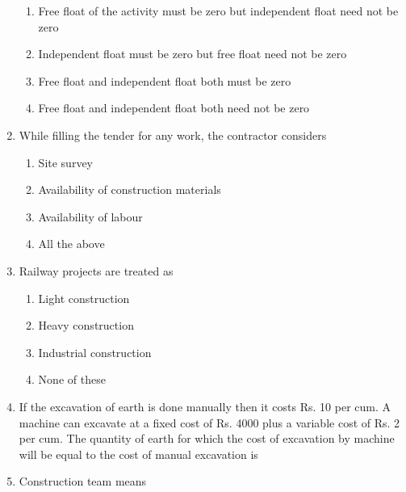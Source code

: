 \documentclass[11pt,a4paper]{article}
\begin{document}
\begin{enumerate}
\begin{enumerate}[label=\Alph*.]
\item{Free float of the activity must be zero but independent float need not be zero}
\item{Independent float must be zero but free float need not be zero}
\item{Free float and independent float both must be zero}
\item{Free float and independent float both need not be zero}
\end{enumerate}
\item{While filling the tender for any work, the contractor considers}
\begin{enumerate}[label=\Alph*.]
\item{Site survey}
\item{Availability of construction materials}
\item{Availability of labour}
\item{All the above}
\end{enumerate}
\item{Railway projects are treated as}
\begin{enumerate}[label=\Alph*.]
\item{Light construction}
\item{Heavy construction}
\item{Industrial construction}
\item{None of these}
\end{enumerate}
\item{If the excavation of earth is done manually then it costs Rs. 10 per cum. A machine can excavate at a fixed cost of Rs. 4000 plus a variable cost of Rs. 2 per cum. The quantity of earth for which the cost of excavation by machine will be equal to the cost of manual excavation is}
\\
\item{Construction team means}
\\
\end{enumerate}
\end{document}
